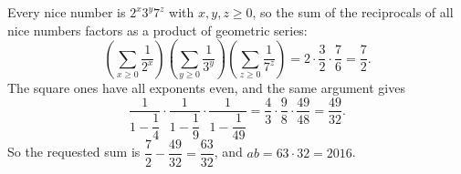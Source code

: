 Every nice number is $2^x3^y7^z$ with $x,y,z\ge0$, so the sum of the reciprocals of all nice numbers factors as a product of geometric series:
\[\left(\sum_{x\ge0}\dfrac{1}{2^x}\right)\left(\sum_{y\ge0}\dfrac{1}{3^y}\right)\left(\sum_{z\ge0}\dfrac{1}{7^z}\right)=2\cdot\dfrac{3}{2}\cdot\dfrac{7}{6}=\dfrac{7}{2}.\]
The square ones have all exponents even, and the same argument gives
\[\dfrac{1}{1-\dfrac{1}{4}}\cdot\dfrac{1}{1-\dfrac{1}{9}}\cdot\dfrac{1}{1-\dfrac{1}{49}}=\dfrac{4}{3}\cdot\dfrac{9}{8}\cdot\dfrac{49}{48}=\dfrac{49}{32}.\]
So the requested sum is $\dfrac{7}{2}-\dfrac{49}{32}=\dfrac{63}{32}$, and $ab=63\cdot32=\boxed{2016}$.
